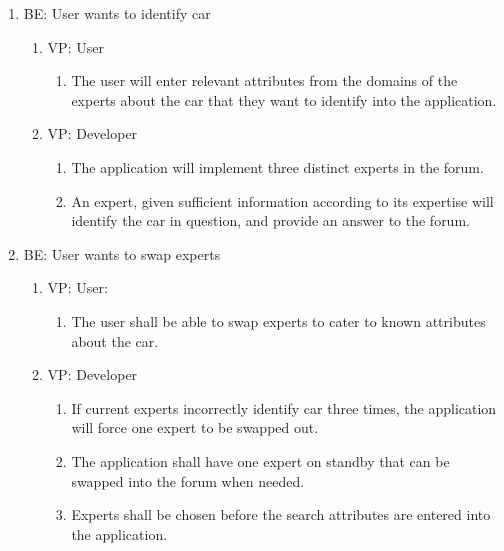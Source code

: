 \documentclass[12pt]{article}
\begin{document}
\begin{enumerate}
    \item BE: User wants to identify car
    \begin{enumerate}
        \item VP: User
        \begin{enumerate}
            \item The user will enter relevant attributes from the domains of the experts about the car that they want to identify into the application.
        \end{enumerate}
        \item VP: Developer
        \begin{enumerate}
            \item The application will implement three distinct experts in the forum.
            \item An expert, given sufficient information according to its expertise will identify the car in question, and provide an answer to the forum.
        \end{enumerate}
    \end{enumerate}
    
	\item BE: User wants to swap experts
	\begin{enumerate}
		\item VP: User:
		\begin{enumerate}
			\item The user shall be able to swap experts to cater to known attributes about the car.
		\end{enumerate}
		\item VP: Developer
		\begin{enumerate}
			\item If current experts incorrectly identify car three times, the application will force one expert to be swapped out.
			\item The application shall have one expert  on standby that can be swapped into the forum when needed.
			\item Experts shall be chosen before the search attributes are entered into the application.
		\end{enumerate}
	\end{enumerate}
	

\end{enumerate}
\end{document}
